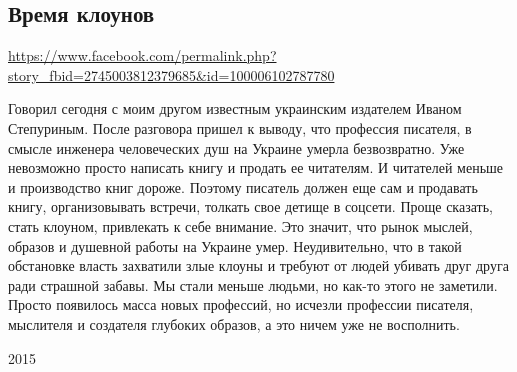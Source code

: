  
 
 
 
 

\subsection{Время клоунов}
\label{sec:08_06_2020.fb.zharkih_denis.1.vremja_klounov}
\url{https://www.facebook.com/permalink.php?story_fbid=2745003812379685&id=100006102787780}

Говорил сегодня с моим другом известным украинским издателем Иваном Степуриным.
После разговора пришел к выводу, что профессия писателя, в смысле инженера
человеческих душ на Украине умерла безвозвратно. Уже невозможно просто написать
книгу и продать ее читателям. И читателей меньше и производство книг дороже.
Поэтому писатель должен еще сам и продавать книгу, организовывать встречи,
толкать свое детище в соцсети. Проще сказать, стать клоуном, привлекать к себе
внимание. Это значит, что рынок мыслей, образов и душевной работы на Украине
умер. Неудивительно, что в такой обстановке власть захватили злые клоуны и
требуют от людей убивать друг друга ради страшной забавы. Мы стали меньше
людьми, но как-то этого не заметили. Просто появилось масса новых профессий, но
исчезли профессии писателя, мыслителя и создателя глубоких образов, а это ничем
уже не восполнить.  

2015
